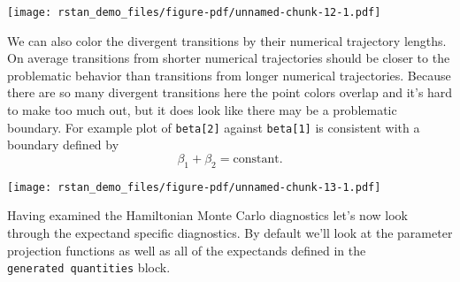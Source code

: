 \documentclass[
  letterpaper,
  DIV=11,
  numbers=noendperiod]{scrartcl}
\newenvironment{Shaded}{\begin{snugshade}}{\end{snugshade}}
\newcommand{\AttributeTok}[1]{\textcolor[rgb]{0.40,0.45,0.13}{#1}}
\newcommand{\ControlFlowTok}[1]{\textcolor[rgb]{0.00,0.23,0.31}{#1}}
\newcommand{\DecValTok}[1]{\textcolor[rgb]{0.68,0.00,0.00}{#1}}
\newcommand{\FunctionTok}[1]{\textcolor[rgb]{0.28,0.35,0.67}{#1}}
\newcommand{\NormalTok}[1]{\textcolor[rgb]{0.00,0.23,0.31}{#1}}
\newcommand{\OtherTok}[1]{\textcolor[rgb]{0.00,0.23,0.31}{#1}}
\newcommand{\SpecialCharTok}[1]{\textcolor[rgb]{0.37,0.37,0.37}{#1}}
\newcommand{\StringTok}[1]{\textcolor[rgb]{0.13,0.47,0.30}{#1}}
\begin{document}
\begin{Shaded}
\end{Shaded}

\texttt{[image: rstan\_demo\_files/figure-pdf/unnamed-chunk-12-1.pdf]}

We can also color the divergent transitions by their numerical
trajectory lengths. On average transitions from shorter numerical
trajectories should be closer to the problematic behavior than
transitions from longer numerical trajectories. Because there are so
many divergent transitions here the point colors overlap and it's hard
to make too much out, but it does look like there may be a problematic
boundary. For example plot of \texttt{beta{[}2{]}} against
\texttt{beta{[}1{]}} is consistent with a boundary defined by \[
\beta_{1} + \beta_{2} = \mathrm{constant}.
\]

\begin{Shaded}
\end{Shaded}

\texttt{[image: rstan\_demo\_files/figure-pdf/unnamed-chunk-13-1.pdf]}

Having examined the Hamiltonian Monte Carlo diagnostics let's now look
through the expectand specific diagnostics. By default we'll look at the
parameter projection functions as well as all of the expectands defined
in the \texttt{generated\ quantities} block.
\end{document}
